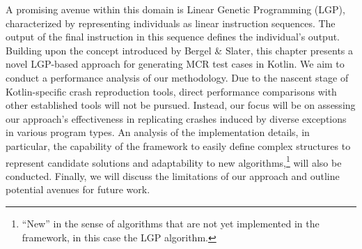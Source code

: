     A promising avenue within this domain is Linear Genetic Programming (LGP), characterized by representing 
    individuals as linear instruction sequences. The output of the final instruction in this sequence defines the 
    individual's output. Building upon the concept introduced by Bergel \& Slater, this chapter presents a novel 
    LGP-based approach for generating MCR test cases in Kotlin. We aim to conduct a performance analysis of our 
    methodology. Due to the nascent stage of Kotlin-specific crash reproduction tools, direct performance comparisons 
    with other established tools will not be pursued. Instead, our focus will be on assessing our approach's 
    effectiveness in replicating crashes induced by diverse exceptions in various program types. An analysis of the
    implementation details, in particular, the capability of the framework to easily define complex structures to 
    represent candidate solutions and adaptability to new algorithms,\footnote{
        \enquote{New} in the sense of algorithms that are not yet implemented in the framework, in this case the LGP
        algorithm.
    } will also be conducted. Finally, we will discuss the limitations of our approach and outline potential avenues for
    future work.
    